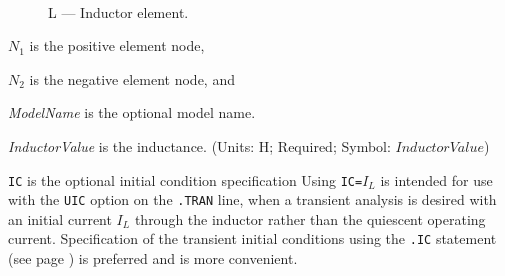 
\begin{figure}[h]
\centering
\ 
\caption{L --- Inductor element.\label{l:fig}}
\end{figure}

{}


\begin{widelist}
\item[$N_1$] is the positive element node,
\item[$N_2$] is the negative element  node, and
\item[{\it ModelName}]  is  the optional  model name.
\item[{\it InductorValue}]  is  the  inductance.
               (Units: H; Required; Symbol: $InductorValue$)
\item[{\tt IC}] is the optional  initial condition specification
      Using {\tt IC=}$I_L$ is intended for use with the {\tt UIC} option
      on  the  {\tt .TRAN}  line,  when  a transient analysis is desired
      with an initial current $I_L$ through the inductor
      rather than the quiescent operating current.
      Specification of the transient initial conditions using the {\tt .IC}
      statement (see page \pageref{.ICstatement}) is preferred and is more
      convenient.
\end{widelist}


\marginid{}
{}
\label{INDmodelpspice}




